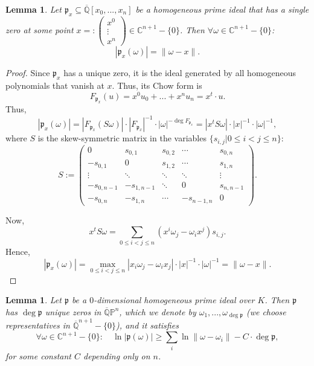 \documentclass[reqno]{amsart}
\theoremstyle{plain}
\newtheorem{Lem}[Cor]{Lemma}
\theoremstyle{definition}
\theoremstyle{remark}
\theoremstyle{plain}
\begin{document}
\begin{Lem}\label{Lemma Chow form of single point}
Let $\mathfrak p_x\subseteq\overline{\mathbb Q}[x_0,...,x_n]$ be a homogeneous prime ideal that has a single zero at some point $x=:
\begin{pmatrix}
    x^0 \\
    \vdots \\
    x^n
\end{pmatrix}
\in\mathbb C^{n+1}-\{0\}$. Then $\forall\omega\in\mathbb C^{n+1}-\{0\}$:
\[
    |\mathfrak p_x(\omega)|
        =
    \|\omega-x\|
.\]
\end{Lem}

\begin{proof}
Since $\mathfrak p_x$ has a unique zero, it is the ideal generated by all homogeneous polynomials that vanish at $x$. Thus, its Chow form is
\[
    F_{\mathfrak p_x}(u)
        =
    x^0u_0+...+x^nu_n
        =
    x^t\cdot u
.\]
Thus,
\[
    |\mathfrak p_x(\omega)|
        =
    |F_{\mathfrak p_x}(S\omega)|\cdot|F_{\mathfrak p_x}|^{-1}\cdot|\omega|^{-\deg F_{\mathfrak p_x}}
        =
    |x^tS\omega|\cdot|x|^{-1}\cdot|\omega|^{-1}
,\]
where $S$ is the skew-symmetric matrix in the variables $\{s_{i,j}|0\leq i<j\leq n\}$:
\[
    S
        :=
    \begin{pmatrix}
        0                    &   s_{0,1}       &    s_{0,2}    &   \cdots          &    s_{0,n}\\
        -s_{0,1}    &   0                     &   s_{1,2}     &   \cdots          &    s_{1,n}\\
        \vdots         & \ddots           &   \ddots       &   \ddots          &    \vdots\\
        -s_{0,n-1}& -s_{1,n-1} &   \ddots       &   0                      &    s_{n,n-1}\\
        -s_{0,n}    & -s_{1,n}      &   \cdots       &   -s_{n-1,n} &    0
    \end{pmatrix}
.\]

Now,
\[
    x^tS\omega
        =
    \sum_{0\leq i<j\leq n}(x^i\omega_j-\omega_ix^j)s_{i,j}
.\]
Hence,
\[
    |\mathfrak p_x(\omega)|
        =
    \max_{0\leq i<j\leq n}|x_i\omega_j-\omega_ix_j|\cdot|x|^{-1}\cdot|\omega|^{-1}
        =
    \|\omega-x\|
.\]
\end{proof}

\begin{Lem}\label{Lemma zero dimensional ln|p(omega)|}
Let $\mathfrak p$ be a $0$-dimensional homogeneous prime ideal over $K$. Then $\mathfrak p$ has $\deg\mathfrak p$ unique zeros in $\overline{{\mathbb Q}}\mathbb{P}^n$, which we denote by $\omega_1,...,\omega_{\deg\mathfrak p}$ (we choose representatives in $\overline{\mathbb Q}^{n+1}-\{0\}$), and it satisfies
\[
    \forall\omega\in\mathbb C^{n+1}-\{0\}:\quad
    \ln|\mathfrak p(\omega)|
        \geq
    \sum_i \ln\|\omega-\omega_i\|
        -
    C\cdot\deg\mathfrak p
,\]
for some constant $C$ depending only on $n$.
\end{Lem}
\end{document}
